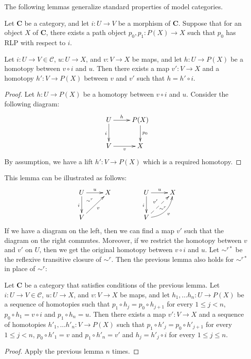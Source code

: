 \documentclass{tac}
\theoremstyle{definition}
\newcommand{\cof}{\mathcal{C}}
\newcommand{\cat}[1]{\mathbf{#1}}
\newcommand{\C}{\cat{C}}
\begin{document}
The following lemmas generalize standard properties of model categories.

\begin{lem}
Let $\C$ be a category, and let $i : U \to V$ be a morphism of $\C$.
Suppose that for an object $X$ of $\C$, there exists a path object $p_0,p_1 : P(X) \to X$ such that $p_0$ has RLP with respect to $i$.

Let $i : U \to V \in \cof$, $u : U \to X$, and $v : V \to X$ be maps, and let $h : U \to P(X)$ be a homotopy between $v \circ i$ and $u$.
Then there exists a map $v' : V \to X$ and a homotopy $h' : V \to P(X)$ between $v$ and $v'$ such that $h = h' \circ i$.
\end{lem}
\begin{proof}
Let $h : U \to P(X)$ be a homotopy between $v \circ i$ and $u$.
Consider the following diagram:
\[ \xymatrix{ U \ar[r]^-h \ar[d]_i & P(X) \ar[d]^{p_0} \\
              V \ar[r]_v & X
            } \]
By assumption, we have a lift $h' : V \to P(X)$ which is a required homotopy.
\end{proof}

This lemma can be illustrated as follows:
\[ \xymatrix{ U \ar[r]^u \ar[d]_i \ar@{}[dr]|(.3){\sim^r} & X \\
              V \ar[ur]_v &
            }
\qquad \qquad
   \xymatrix{ U \ar[r]^u \ar[d]_i \ar@{}[dr]|(.62){\sim^r} & X \\
              V \ar@{-->}[ur]^{v'} \ar@/_1pc/[ur]_v &
            } \]
If we have a diagram on the left, then we can find a map $v'$ such that the diagram on the right commutes.
Moreover, if we restrict the homotopy between $v$ and $v'$ on $U$, then we get the original homotopy between $v \circ i$  and $u$.
Let $\sim^{r*}$ be the reflexive transitive closure of $\sim^r$.
Then the previous lemma also holds for $\sim^{r*}$ in place of $\sim^r$:

\begin{lem}
Let $\C$ be a category that satisfies conditions of the previous lemma.
Let $i : U \to V \in \cof$, $u : U \to X$, and $v : V \to X$ be maps, and let $h_1, \ldots h_n : U \to P(X)$ be a sequence of homotopies
such that $p_1 \circ h_j = p_0 \circ h_{j+1}$ for every $1 \leq j < n$, $p_0 \circ h_1 = v \circ i$ and $p_1 \circ h_n = u$.
Then there exists a map $v' : V \to X$ and a sequence of homotopies $h'_1, \ldots h'_n : V \to P(X)$
such that $p_1 \circ h'_j = p_0 \circ h'_{j+1}$ for every $1 \leq j < n$, $p_0 \circ h'_1 = v$ and $p_1 \circ h'_n = v'$ and $h_j = h'_j \circ i$ for every $1 \leq j \leq n$.
\end{lem}
\begin{proof}
Apply the previous lemma $n$ times.
\end{proof}
\end{document}
